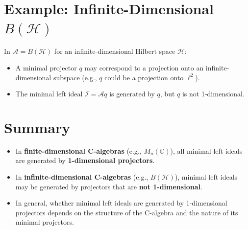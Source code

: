 \documentclass{article}
\begin{document}
\section*{Example: Infinite-Dimensional \( B(\mathcal{H}) \)}

In \( \mathcal{A} = B(\mathcal{H}) \) for an infinite-dimensional Hilbert space \( \mathcal{H} \):
\begin{itemize}
    \item A minimal projector \( q \) may correspond to a projection onto an infinite-dimensional subspace (e.g., \( q \) could be a projection onto \( \ell^2 \)).
    \item The minimal left ideal \( \mathcal{I} = \mathcal{A} q \) is generated by \( q \), but \( q \) is not 1-dimensional.
\end{itemize}

\section*{Summary}
\begin{itemize}
    \item In \textbf{finite-dimensional C\*-algebras} (e.g., \( M_n(\mathbb{C}) \)), all minimal left ideals are generated by \textbf{1-dimensional projectors}.
    \item In \textbf{infinite-dimensional C\*-algebras} (e.g., \( B(\mathcal{H}) \)), minimal left ideals may be generated by projectors that are \textbf{not 1-dimensional}.
    \item In general, whether minimal left ideals are generated by 1-dimensional projectors depends on the structure of the C\*-algebra and the nature of its minimal projectors.
\end{itemize}
\end{document}
